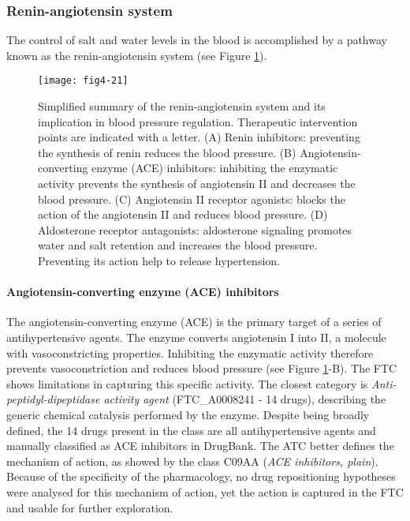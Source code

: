 \subsubsection{Renin-angiotensin system}
The control of salt and water levels in the blood is accomplished by a pathway known as the renin-angiotensin system (see Figure \ref{fig4-21}).

\begin{figure}[H]
    \centering
    \texttt{[image: fig4-21]}
    \caption{Simplified summary of the renin-angiotensin system and its implication in blood pressure regulation. Therapeutic intervention points are indicated with a letter. (A) Renin inhibitors: preventing the synthesis of renin reduces the blood pressure. (B) Angiotensin-converting enzyme (ACE) inhibitors: inhibiting the enzymatic activity prevents the synthesis of angiotensin II and decreases the blood pressure. (C) Angiotensin II receptor agonists: blocks the action of the angiotensin II and reduces blood pressure. (D) Aldosterone receptor antagonists: aldosterone signaling promotes water and salt retention and increases the blood pressure. Preventing its action help to release hypertension.}
    \label{fig4-21}
\end{figure}

\paragraph{\textbf{Angiotensin-converting enzyme (ACE) inhibitors}\\}
The angiotensin-converting enzyme (ACE) is the primary target of a series of antihypertensive agents. The enzyme converts angiotensin I into II, a molecule with vasoconstricting properties. Inhibiting the enzymatic activity therefore prevents vasoconstriction and reduces blood pressure (see Figure \ref{fig4-21}-B).
The FTC shows limitations in capturing this specific activity. The closest category is \emph{Anti-peptidyl-dipeptidase activity agent} (FTC\_A0008241 - 14 drugs), describing the generic chemical catalysis performed by the enzyme. Despite being broadly defined, the 14 drugs present in the class are all antihypertensive agents and manually classified as ACE inhibitors in DrugBank. The ATC better defines the mechanism of action, as showed by the class C09AA (\emph{ACE inhibitors, plain}). Because of the specificity of the pharmacology, no drug repositioning hypotheses were analysed for this mechanism of action, yet the action is captured in the FTC and usable for further exploration.

